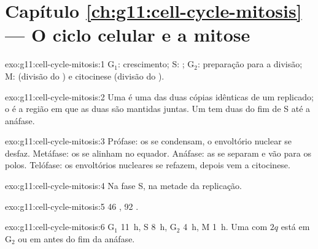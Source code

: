 \section*{Capítulo \ref{ch:g11:cell-cycle-mitosis} --- O ciclo celular e a mitose}

\begin{solution}{exo:g11:cell-cycle-mitosis:1}
$\mathrm{G_1}$: crescimento; S: ; $\mathrm{G_2}$:
preparação para a divisão; M:  (divisão do ) e citocinese
(divisão do ).
\end{solution}

\begin{solution}{exo:g11:cell-cycle-mitosis:2}
Uma  é uma das duas cópias idênticas de um 
replicado; o  é a região em que as duas são mantidas juntas.
Um  tem duas  do fim de S até a anáfase.
\end{solution}

\begin{solution}{exo:g11:cell-cycle-mitosis:3}
Prófase: os  se condensam, o envoltório nuclear se desfaz.
Metáfase: os  se alinham no equador. Anáfase: as 
se separam e vão para os polos. Telófase: os envoltórios nucleares se
refazem, depois vem a citocinese.
\end{solution}

\begin{solution}{exo:g11:cell-cycle-mitosis:4}
Na fase S, na metade da replicação.
\end{solution}

\begin{solution}{exo:g11:cell-cycle-mitosis:5}
46 , 92 .
\end{solution}

\begin{solution}{exo:g11:cell-cycle-mitosis:6}
$\mathrm{G_1}$ \qty{11}{h}, S \qty{8}{h}, $\mathrm{G_2}$ \qty{4}{h},
M \qty{1}{h}. Uma  com $2q$ está em $\mathrm{G_2}$ ou em 
antes do fim da anáfase.
\end{solution}

